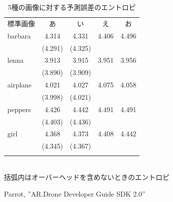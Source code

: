 \documentclass[9pt,dvipdfmx]{jsarticle}
\begin{document}
\begin{table}[t]
\begin{center}
\caption{5種の画像に対する予測誤差のエントロピ}\label{takago-paper2008080800268-tab:1}
\begin{tabular}{lcccc}
\noalign{\hrule height 1pt}
標準画像 & あ & い & え &お\\
\noalign{\hrule height 1pt} 
barbara &4.314&4.331&4.406&4.496\\
        &(4.291)&(4.325)&\\\hline
lenna   &3.913&3.915&3.951&3.956\\
        &(3.890)&(3.909)\\\hline
airplane&4.021&4.027&4.075&4.058\\
        &(3.998)&(4.021)\\\hline
peppers &4.426&4.442&4.491&4.491\\
        &(4.403)&(4.436)\\\hline
girl    &4.368&4.373&4.408&4.442\\
        &(4.345)&(4.367)\\
\noalign{\hrule height 1pt}
\end{tabular}\\
括弧内はオーバーヘッドを含めないときのエントロピ
\end{center}
\end{table}


\begin{thebibliography}{99}
Parrot, ''AR.Drone Developer Guide SDK 2.0''
\end{thebibliography}
\end{document}
